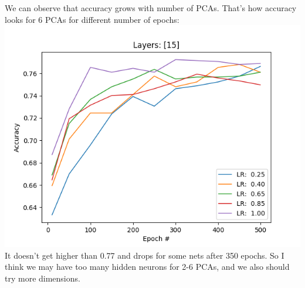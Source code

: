 \documentclass[12pt, letterpaper]{article}
\begin{document}
\begin{enumerate}[label=\Roman*.]
	    We can observe that accuracy grows with number of PCAs. That's how accuracy looks for 6 PCAs for different number of epochs:
	    {\center \includegraphics[scale=0.7]{../images/pca_accuracy_6.png} \\}
	    It doesn't get higher than 0.77 and drops for some nets after 350 epochs. So I think we may have too many hidden neurons for 2-6 PCAs, and we also should try more dimensions.
	    

\end{enumerate}
\end{document}
